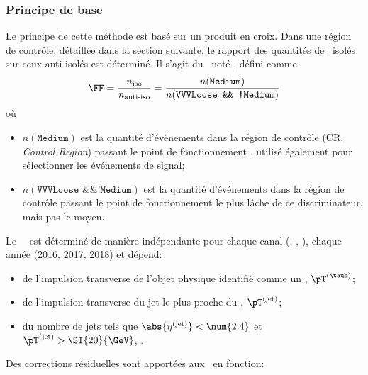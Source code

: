 \subsubsection{Principe de base}
Le principe de cette méthode est basé sur un produit en croix.
Dans une région de contrôle, détaillée dans la section suivante, le rapport des quantités de \tauh\ isolés sur ceux anti-isolés est déterminé.
Il s'agit du \fakefactor\, noté \FF, défini comme
\begin{equation}
\FF = \frac{n_\text{iso}}{n_\text{anti-iso}} = \frac{n(\texttt{Medium})}{n(\texttt{VVVLoose \&\& !Medium})}
\label{eq-chapter-HTT_analysis-section-bg_estimation-FF_method-FF_def_global}
\end{equation}
où
\begin{itemize}
\item $n(\texttt{Medium})$ est la quantité d'événements dans la région de contrôle (CR, \emph{Control Region}) passant le point de fonctionnement , utilisé également pour sélectionner les événements de signal;
\item $n(\texttt{VVVLoose \&\& !Medium})$ est la quantité d'événements dans la région de contrôle passant le point de fonctionnement le plus lâche de ce discriminateur, mais pas le moyen.
\end{itemize}
Le \fakefactor\ \FF\ est déterminé de manière indépendante pour chaque canal (\tauh\tauh, \mu\tauh, \ele\tauh), chaque année (2016, 2017, 2018) et dépend:
\begin{itemize}
\item de l'impulsion transverse de l'objet physique identifié comme un \tauh, $\pT^{(\tauh)}$;
\item de l'impulsion transverse du jet le plus proche du \tauh, $\pT^{(\text{jet})}$;
\item du nombre de jets tels que $\abs{\eta^{(\text{jet})}}<\num{2.4}$ et $\pT^{(\text{jet})}>\SI{20}{\GeV}$, \Nprebjets.
\end{itemize}
Des corrections résiduelles sont apportées aux \fakefactors\ en fonction:

